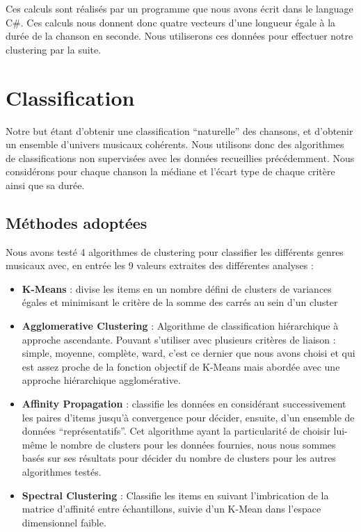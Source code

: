 \documentclass[soumission]{ir}
\begin{document}
Ces calculs sont réalisés par un programme que nous avons écrit dans le language C\#. Ces calculs nous donnent 
donc quatre vecteurs d’une longueur égale à la durée de la chanson en seconde. Nous utiliserons ces données 
pour effectuer notre clustering par la suite.

\section{Classification}
Notre but étant d’obtenir une classification “naturelle” des chansons, et d’obtenir un ensemble d’univers 
musicaux cohérents. Nous utilisons donc des algorithmes de classifications non supervisées avec les données 
recueillies précédemment. Nous considérons pour chaque chanson la médiane et l’écart type de chaque critère
ainsi que sa durée.

\subsection{Méthodes adoptées}
Nous avons testé 4 algorithmes de clustering pour classifier les différents genres musicaux avec, en entrée 
les 9 valeurs extraites des différentes analyses :
\begin{itemize}
    \item{\textbf{K-Means} : divise les items en un nombre défini de clusters de variances égales et minimisant le 
    critère de la somme des carrés au sein d’un cluster}
    \item {\textbf{Agglomerative Clustering} : Algorithme de classification hiérarchique à approche ascendante. 
    Pouvant s’utiliser avec plusieurs critères de liaison : simple, moyenne, complète, ward, c’est ce dernier 
    que nous avons choisi et qui est assez proche de la fonction objectif de K-Means mais abordée avec une 
    approche hiérarchique agglomérative.}
    \item{\textbf{Affinity Propagation} : classifie les données en considérant successivement les paires d’items jusqu’à 
    convergence pour décider, ensuite, d’un ensemble de données “représentatifs”. Cet algorithme ayant la 
    particularité de choisir lui-même le nombre de clusters pour les données fournies, nous nous sommes basés 
    sur ses résultats pour décider du nombre de clusters pour les autres algorithmes testés.}
    \item{\textbf{Spectral Clustering} : Classifie les items en suivant l’imbrication de la matrice d’affinité entre 
    échantillons, suivie d’un K-Mean dans l’espace dimensionnel faible.}
\end{itemize}
\end{document}
